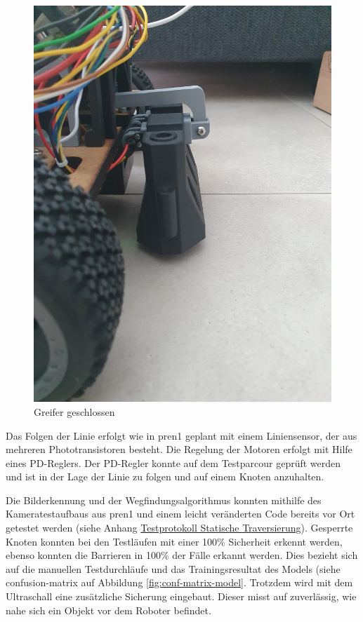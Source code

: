 \begin{figure}[H]
\begin{minipage}[b]{0.49\textwidth}
  \includegraphics[width=\textwidth, angle=-90]{assets/MT/greifer-close.jpg}
  \caption{Greifer geschlossen}
  \label{fig:griefe-rclose}
\end{minipage}
\end{figure}

Das Folgen der Linie erfolgt wie in \acrshort{pren1} geplant mit einem Liniensensor, der aus mehreren Phototransistoren besteht. Die Regelung der Motoren erfolgt mit Hilfe eines PD-Reglers. Der PD-Regler konnte auf dem Testparcour geprüft werden und ist in der Lage der Linie zu folgen und auf einem Knoten anzuhalten.


Die Bilderkennung und der Wegfindungsalgorithmus konnten mithilfe des Kameratestaufbaus aus \acrshort{pren1} und einem leicht veränderten Code bereits vor Ort getestet werden (siehe Anhang \hyperlink{statische-traver.1}{Testprotokoll Statische Traversierung}). Gesperrte Knoten konnten bei den Testläufen mit einer 100\% Sicherheit erkennt werden, ebenso konnten die Barrieren in 100\% der Fälle erkannt werden. Dies bezieht sich auf die manuellen Testdurchläufe und das Trainingsresultat des Models (siehe \gls{confusion-matrix} auf Abbildung \ref{fig:conf-matrix-model}. Trotzdem wird mit dem Ultraschall eine zusätzliche Sicherung eingebaut. Dieser misst auf \pm 1cm zuverlässig, wie nahe sich ein Objekt vor dem Roboter befindet.

